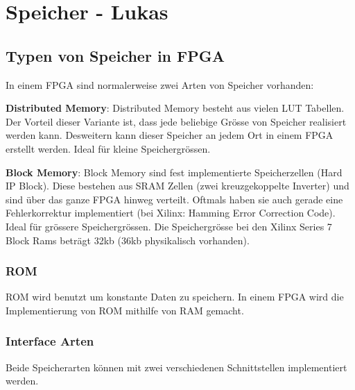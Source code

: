 \section{Speicher - Lukas}
\subsection{Typen von Speicher in FPGA}
In einem FPGA sind normalerweise zwei Arten von Speicher vorhanden:
\begin{compactitem}
    \item \textbf{Distributed Memory}: Distributed Memory besteht aus vielen LUT Tabellen. Der Vorteil dieser Variante ist, dass jede beliebige Grösse von Speicher realisiert werden kann. Desweitern kann dieser Speicher an jedem Ort in einem FPGA erstellt werden. Ideal für kleine Speichergrössen.
    \item \textbf{Block Memory}: Block Memory sind fest implementierte Speicherzellen (Hard IP Block). Diese bestehen aus SRAM Zellen (zwei kreuzgekoppelte Inverter) und sind über das ganze FPGA hinweg verteilt. Oftmals haben sie auch gerade eine Fehlerkorrektur implementiert (bei Xilinx: Hamming Error Correction Code). Ideal für grössere Speichergrössen. Die Speichergrösse bei den Xilinx Series 7 Block Rams beträgt 32kb (36kb physikalisch vorhanden).
\end{compactitem}

\subsubsection{ROM}
ROM wird benutzt um konstante Daten zu speichern. In einem FPGA wird die Implementierung von ROM mithilfe von RAM gemacht.

\subsubsection{Interface Arten}
Beide Speicherarten können mit zwei verschiedenen Schnittstellen implementiert werden.

